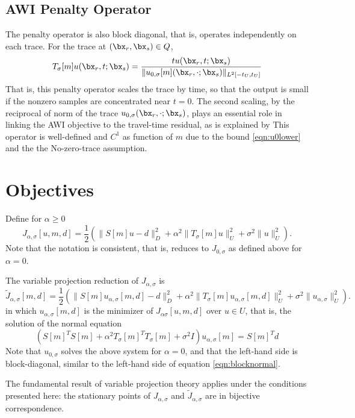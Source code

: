 \subsection{AWI Penalty Operator}
The penalty operator is also block diagonal, that is, operates independently on each trace. For the trace at $(\bx_r,\bx_s) \in Q$, 
\begin{equation}
  \label{eqn:ppf}
  T_{\sigma}[m]u (\bx_r,t;\bx_s) = \frac{t u(\bx_r,t;\bx_s)}{\|u_{0,\sigma}[m](\bx_r,\cdot; \bx_s)\|_{L^2[-t_U,t_U]} }
\end{equation}
That is, this penalty operator scales the trace by time, so that the output is small if the nonzero samples are concentrated near $t=0$. The second scaling, by the reciprocal of norm of the trace $u_{0,\sigma}(\bx_r,\cdot;\bx_s)$, plays an essential role in linking the AWI objective to the travel-time residual, as is explained by \cite{HCSMWS:23a}
This operator is well-defined and $C^1$ as function of $m$ due to the bound \ref{eqn:u0lower} and the the No-zero-trace assumption.

\section{Objectives}
Define for $\alpha \ge 0$
\[
 J_{\alpha,\sigma}[u,m,d] = \frac{1}{2}(\|S[m]u - d\|_D^2 + \alpha^2\|T_\sigma[m]u\|_U^2 + \sigma^2 \|u\|^2_U).
\]
Note that the notation is consistent, that is, reduces to $J_{0,\sigma}$ as defined above for $\alpha=0$.

The variable projection reduction of $J_{\alpha,\sigma}$ is
\begin{equation}
  \label{eqn:jtilde}
 \tilde{J}_{\alpha,\sigma}[m,d] = \frac{1}{2}(\|S[m]u_{\alpha,\sigma}[m,d] - d\|_D^2 + \alpha^2\|T_{\sigma}[m]u_{\alpha,\sigma}[m,d]\|_U^2 + \sigma^2 \|u_{\alpha,\sigma}\|^2_U).
\end{equation}
in which $u_{\alpha,\sigma}[m,d]$ is the minimizer of $J_{\alpha\sigma}[u,m,d]$ over $u \in U$, that is, the solution of the normal equation
\begin{equation}
  \label{eqn:normal}
  (S[m]^TS[m] + \alpha^2T_{\sigma}[m]^TT_{\sigma}[m] + \sigma^2I)u_{\alpha,\sigma}[m] = S[m]^Td
\end{equation}
Note that $u_{0,\sigma}$ solves the above system for $\alpha=0$, and that the left-hand side is block-diagonal, similar to the left-hand side of equation \ref{eqn:blocknormal}.

The fundamental result of variable projection theory \cite[]{GolubPereyra:73} applies under the conditions presented here: the stationary points of $J_{\alpha,\sigma}$ and $\tilde{J}_{\alpha,\sigma}$ are in bijective correspondence.

